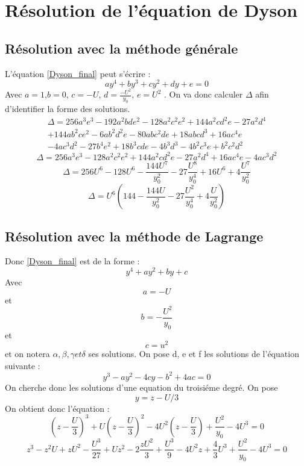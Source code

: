 \documentclass[12pt]{article}
\begin{document}
\section{R\'esolution de l'\'equation de Dyson}
\subsection{R\'esolution avec la m\'ethode g\'en\'erale}

L'\'equation \ref{Dyson_final} peut s'\'ecrire :
\begin{equation}
 a y^4 + b y^3 + c y^2 + d y + e = 0
\end{equation}
Avec $a = 1$,$b = 0$, $c=-U$, $d = \frac{-U^2}{y_0}$, $e=U^2$ .
On va donc calculer $\Delta$ afin d'identifier la forme des solutions.
\begin{align*}
\label{Delta}
 \Delta = 256a^3 e^3 - 192 a^2bde^2 - 128 a^2 c^2 e^2 + 144a^2cd^2e - 27a^2d^4\\ 
 + 144 ab^2ce^2 - 6ab^2d^2e - 80abc^2de + 18abcd^3 + 16ac^4e\\
 -4ac^3d^2-27b^4e^2+18b^3cde - 4b^3d^3 - 4b^2c^3e+b^2c^2d^2
 \end{align*}
\begin{equation}
 \Delta = 256a^3 e^3 - 128 a^2 c^2 e^2 + 144a^2cd^2e - 27a^2d^4 + 16ac^4e -4ac^3d^2
\end{equation}
\begin{equation}
 \Delta = 256 U^6 -128 U^6 - \frac{144U^7}{y_0^2} - 27 \frac{U^8}{y_0^4} + 16 U^6 + 4 \frac{U^7}{y_0^2}
\end{equation}
\begin{equation}
 \Delta = U^6(144 - \frac{144U}{y_0^2} - 27 \frac{U^2}{y_0^4} + 4 \frac{U}{y_0^2})
\end{equation}




\subsection{R\'esolution avec la m\'ethode de Lagrange}
Donc \ref{Dyson_final} est de la forme :
\begin{equation}
y^4 + a y^2 + b y + c 
\end{equation}
Avec $$a = -U$$ et $$b = -\frac{U^2}{y_0}$$ et $$c = u^2$$
et on notera $\alpha, \beta, \gamma et \delta$ ses solutions. 
On pose d, e et f les solutions de l'\'equation suivante : 
\begin{equation}
y^3 - a y^2 -4cy - b^2 + 4 ac = 0
\end{equation}
On cherche donc les solutions d'une equation du troisi\'eme degr\'e.
On pose $$y = z - U/3$$
On obtient donc l'\'equation :
\begin{equation}
(z - \frac{U}{3})^3  + U (z - \frac{U}{3})^2 - 4 U ^2(z - \frac{U}{3}) + \frac{U^2}{y_0} - 4U^3 = 0
\end{equation}
\begin{equation}
z^3-z^2U+zU^2 - \frac{U^3}{27}+Uz^2-2\frac{zU^2}{3}+ \frac{U^3}{9} - 4U^2z+\frac{4}{3}U^3+\frac{U^2}{y_0}-4U^3 = 0
\end{equation}
\end{document}
